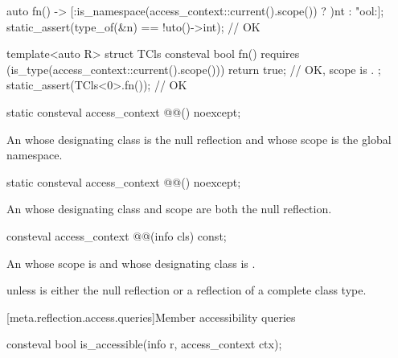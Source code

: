 \begin{itemdescr}
\begin{example}
\begin{codeblock}
{  auto fn() -> [:is_namespace(access_context::current().scope()) ? ^^int : ^^bool:];
  static_assert(type_of(^^fn) == ^^auto()->int);                            // OK

  template<auto R>
    struct TCls {
      consteval bool fn()
        requires (is_type(access_context::current().scope())) {
          return true;                  // OK, scope is .
        }
    };
  static_assert(TCls<0>{}.fn());        // OK
}
\end{codeblock}
\end{example}
\end{itemdescr}

\begin{itemdecl}
static consteval access_context @@() noexcept;
\end{itemdecl}

\begin{itemdescr}
\pnum
\returns
An  whose designating class is the null reflection
and whose scope is the global namespace.
\end{itemdescr}

\begin{itemdecl}
static consteval access_context @@() noexcept;
\end{itemdecl}

\begin{itemdescr}
\pnum
\returns
An  whose designating class and scope
are both the null reflection.
\end{itemdescr}

\begin{itemdecl}
consteval access_context @@(info cls) const;
\end{itemdecl}

\begin{itemdescr}
\pnum
\returns
An  whose scope is 
and whose designating class is .

\pnum
\throws
{} unless
 is either the null reflection
or a reflection of a complete class type.
\end{itemdescr}

[meta.reflection.access.queries]{Member accessibility queries}

%
\begin{itemdecl}
consteval bool is_accessible(info r, access_context ctx);
\end{itemdecl}

